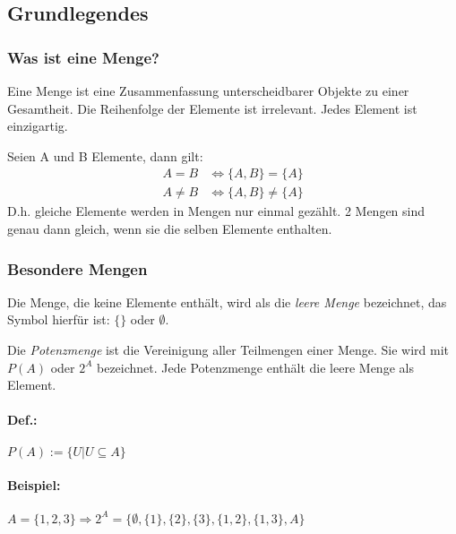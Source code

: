 \subsection{Grundlegendes}
\subsubsection*{Was ist eine Menge?}
Eine Menge ist eine Zusammenfassung unterscheidbarer Objekte zu einer
Gesamtheit. Die Reihenfolge der Elemente ist irrelevant. Jedes Element ist
einzigartig.

Seien A und B Elemente, dann gilt:
\begin{align}
  A = B    &\Leftrightarrow \{A, B\} = \{A\} \\
  A \neq B &\Leftrightarrow \{A, B\} \neq \{A\}
\end{align}
D.h. gleiche Elemente werden in Mengen nur einmal gezählt.
2 Mengen sind genau dann gleich, wenn sie die selben Elemente
enthalten.
\subsubsection*{Besondere Mengen}
Die Menge, die keine Elemente enthält, wird als die \emph{leere Menge}
bezeichnet, das Symbol hierfür ist: $\{\}$ oder ${}\emptyset$.

Die \emph{Potenzmenge} ist die Vereinigung aller Teilmengen einer Menge.
Sie wird mit \(P(A)\) oder \(2^A\) bezeichnet. Jede Potenzmenge
enthält die leere Menge als Element.

\paragraph{Def.:} $P(A):= \{ U| {U}\subseteq{A} \}$
\paragraph{Beispiel:}
\begin{math}
{A = \{1,2,3\} }
\Rightarrow{2^A = \{ \emptyset, \{1\},\{2\},\{3\},\{1,2\},\{1,3\},A \} }
\end{math}